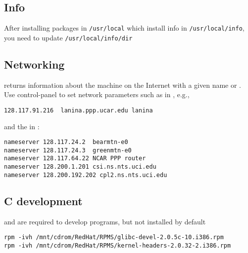 \documentclass[12pt,twoside]{article}
\begin{document}
\subsection{Info}\label{sxn:info}
After installing packages in \verb'/usr/local' which install info in \verb'/usr/local/info', 
you need to update \verb'/usr/local/info/dir'

\subsection{Networking}\label{sxn:ntw}
 returns information about the machine on the
Internet with a given name or .
Use control-panel to set network parameters such as 
 in , e.g.,
\begin{verbatim}
128.117.91.216  lanina.ppp.ucar.edu lanina
\end{verbatim}
and the  in :
\begin{verbatim}
nameserver 128.117.24.2  bearmtn-e0
nameserver 128.117.24.3  greenmtn-e0
nameserver 128.117.64.22 NCAR PPP router
nameserver 128.200.1.201 csi.ns.nts.uci.edu
nameserver 128.200.192.202 cpl2.ns.nts.uci.edu
\end{verbatim}

\subsection{C development}\label{sxn:c}
 and  are required to
develop  programs, but not installed by default 
\begin{verbatim}
rpm -ivh /mnt/cdrom/RedHat/RPMS/glibc-devel-2.0.5c-10.i386.rpm
rpm -ivh /mnt/cdrom/RedHat/RPMS/kernel-headers-2.0.32-2.i386.rpm
\end{verbatim}
\end{document}
